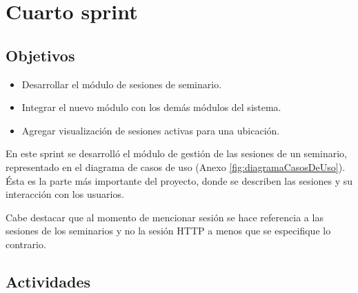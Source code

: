 \section{Cuarto sprint} %
\label{sec:cuarto_sprint}

\subsection{Objetivos}

\begin{itemize}
	\item Desarrollar el módulo de sesiones de seminario.
	\item Integrar el nuevo módulo con los demás módulos del sistema.
	\item Agregar visualización de sesiones activas para una ubicación.
\end{itemize}

En este sprint se desarrolló el módulo de gestión de las sesiones de un seminario, representado en el diagrama de casos de uso (Anexo \ref{fig:diagramaCasosDeUso}). Ésta es la parte más importante del proyecto, donde se describen las sesiones y su interacción con los usuarios.

Cabe destacar que al momento de mencionar sesión se hace referencia a las sesiones de los seminarios y no la sesión \gls{HTTP} a menos que se especifique lo contrario.

\subsection{Actividades} %
\label{sub:actividades4}

